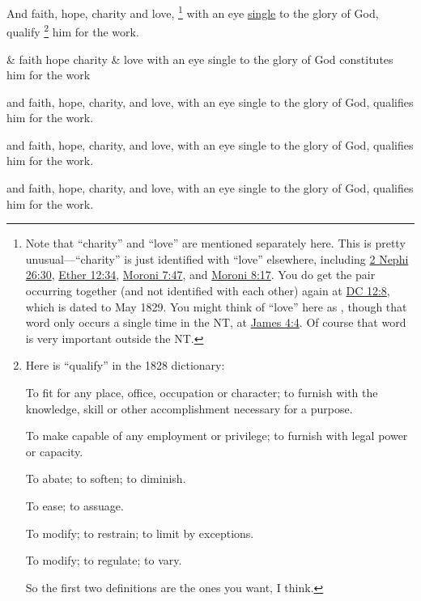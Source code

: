 		And faith, hope, charity and love,%
			\footnote{%
				Note that ``charity'' and ``love'' are mentioned separately here. This is pretty unusual---``charity'' is just identified with ``love'' elsewhere, including \hyperref[2NEPHI-26-30]{2 Nephi 26:30}, \hyperref[ETHER-12-34]{Ether 12:34}, \hyperref[MORONI-7-47]{Moroni 7:47}, and \hyperref[MORONI-8-17]{Moroni 8:17}. You do get the pair occurring together (and not identified with each other) again at \hyperref[DC12-8]{DC 12:8}, which is dated to May 1829. You might think of ``love'' here as , though that word only occurs a single time in the NT, at \hyperref[JAMES-4-4]{James 4:4}. Of course that word is very important outside the NT.
				}
		with an eye \hyperref[SINGLE]{single} to the glory of God, qualify%
			\footnote{%
				Here is ``qualify'' in the 1828 dictionary:
					\begin{compactitem}
						\item[1] To fit for any place, office, occupation or character; to furnish with the knowledge, skill or other accomplishment necessary for a purpose.
						\item[2] To make capable of any employment or privilege; to furnish with legal power or capacity.
						\item[3] To abate; to soften; to diminish.
						\item[4] To ease; to assuage.
						\item[5] To modify; to restrain; to limit by exceptions.
						\item[6] To modify; to regulate; to vary.
					\end{compactitem}
				So the first two definitions are the ones you want, I think.
				}
		him for the work.

		\begin{framed}
		\scriptsize
			\begin{compactdesc}
				\item[JSP] \& faith hope charity \& love with an eye single to the glory of God constitutes him for the work
				\item[RB1] [\textit{missing}]
				\item[BC] and faith, hope, charity, and love, with an eye single to the glory of God, qualifies him for the work.
				\item[DC 1835] and faith, hope, charity, and love, with an eye single to the glory of God, qualifies him for the work.
				\item[DC 1844] and faith, hope, charity, and love, with an eye single to the glory of God, qualifies him for the work.
			\end{compactdesc}
		\end{framed}

